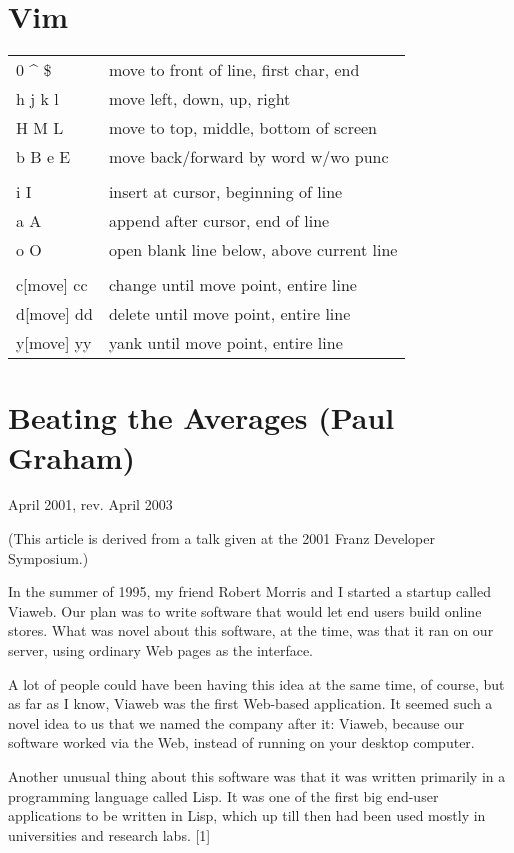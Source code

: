 \documentclass[10pt,twoside,openright]{memoir}
\begin{document}
\pagestyle{empty}


\chapter{Vim}


\begin{tabular}{ll}
0 \^{} \$ & move to front of line, first char, end \\
h j k l & move left, down, up, right \\
H M L & move to top, middle, bottom of screen \\
b B e E & move back/forward by word w/wo punc \\
& \\
i I & insert at cursor, beginning of line \\
a A & append after cursor, end of line \\
o O & open blank line below, above current line \\
& \\
c[move] cc & change until move point, entire line \\
d[move] dd & delete until move point, entire line \\
y[move] yy & yank until move point, entire line \\
\end{tabular}



\chapter{Beating the Averages (Paul Graham)}

April 2001, rev. April 2003

(This article is derived from a talk given at the 2001 Franz Developer Symposium.) 

In the summer of 1995, my friend Robert Morris and I started a startup called Viaweb. Our plan was to write software that would let end users build online stores. What was novel about this software, at the time, was that it ran on our server, using ordinary Web pages as the interface.

A lot of people could have been having this idea at the same time, of course, but as far as I know, Viaweb was the first Web-based application. It seemed such a novel idea to us that we named the company after it: Viaweb, because our software worked via the Web, instead of running on your desktop computer.

Another unusual thing about this software was that it was written primarily in a programming language called Lisp. It was one of the first big end-user applications to be written in Lisp, which up till then had been used mostly in universities and research labs. [1]
\end{document}
